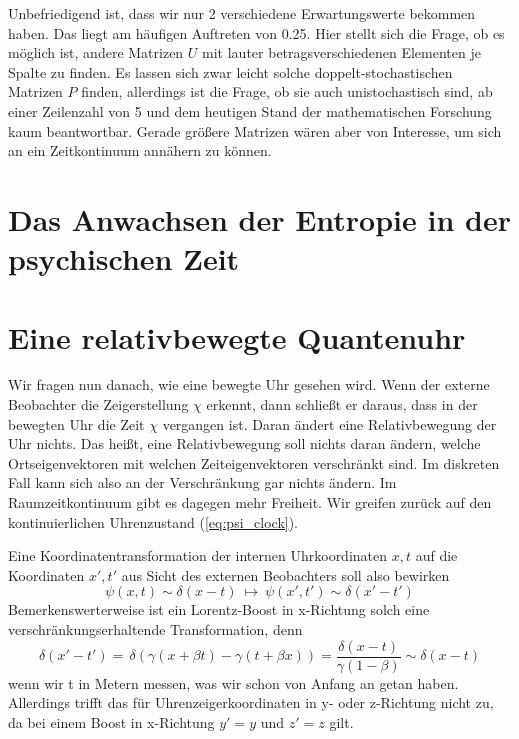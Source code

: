\documentclass[12pt]{article}
\begin{document}
Unbefriedigend ist, dass wir nur 2 verschiedene Erwartungswerte bekommen haben. Das liegt am häufigen Auftreten von 0.25. Hier stellt sich die Frage, ob es möglich ist, andere Matrizen $U$ mit lauter betragsverschiedenen Elementen je Spalte zu finden. Es lassen sich zwar leicht solche doppelt-stochastischen Matrizen $P$ finden, allerdings ist die Frage, ob sie auch unistochastisch sind, ab einer Zeilenzahl von 5 und dem heutigen Stand der mathematischen Forschung kaum beantwortbar. Gerade größere Matrizen wären aber von Interesse, um sich an ein Zeitkontinuum annähern zu können.

\section{Das Anwachsen der Entropie in der psychischen Zeit}


\section{Eine relativbewegte Quantenuhr}

Wir fragen nun danach, wie eine bewegte Uhr gesehen wird. Wenn der externe Beobachter die Zeigerstellung $\chi$ erkennt, dann schließt er daraus, dass in der bewegten Uhr die Zeit $\chi$ vergangen ist. Daran ändert eine Relativbewegung der Uhr nichts. Das heißt, eine Relativbewegung soll nichts daran ändern, welche Ortseigenvektoren mit welchen Zeiteigenvektoren verschränkt sind. Im diskreten Fall kann sich also an der Verschränkung gar nichts ändern. Im Raumzeitkontinuum gibt es dagegen mehr Freiheit. Wir greifen zurück auf den kontinuierlichen Uhrenzustand (\ref{eq:psi_clock}). 

Eine Koordinatentransformation der internen Uhrkoordinaten $x,t$ auf die Koordinaten $x',t'$ aus Sicht des externen Beobachters soll also bewirken
\begin{equation} 
\psi(x,t) \sim \delta(x-t)\ \longmapsto \ \psi(x',t') \sim \delta(x'-t')
\end{equation} 
Bemerkenswerterweise ist ein Lorentz-Boost in x-Richtung solch eine verschränkungserhaltende Transformation, denn
\begin{equation} 
\delta(x'-t') =\, \delta(\gamma (x + \beta t) - \gamma (t + \beta x)) 
= \frac{\delta(x-t)}{\gamma (1-\beta)} \sim \delta(x-t)
\end{equation}
wenn wir t in Metern messen, was wir schon von Anfang an getan haben. Allerdings trifft das für Uhrenzeigerkoordinaten in y- oder z-Richtung nicht zu, da bei einem Boost in x-Richtung $y'=y$ und $z'=z$ gilt.
\end{document}
